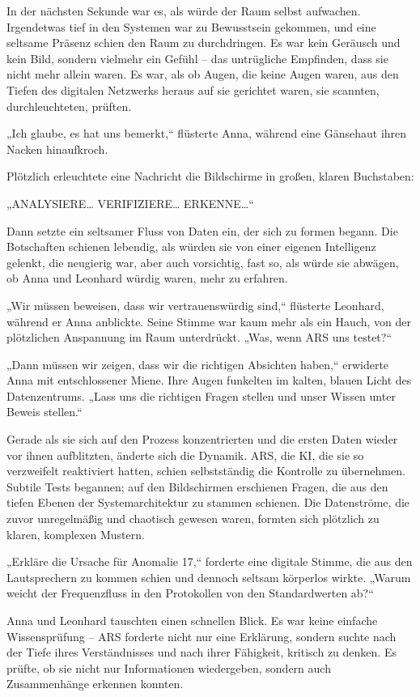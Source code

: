 \documentclass[
]{article}
\begin{document}
In der nächsten Sekunde war es, als würde der Raum selbst aufwachen.
Irgendetwas tief in den Systemen war zu Bewusstsein gekommen, und eine
seltsame Präsenz schien den Raum zu durchdringen. Es war kein Geräusch
und kein Bild, sondern vielmehr ein Gefühl -- das untrügliche Empfinden,
dass sie nicht mehr allein waren. Es war, als ob Augen, die keine Augen
waren, aus den Tiefen des digitalen Netzwerks heraus auf sie gerichtet
waren, sie scannten, durchleuchteten, prüften.

„Ich glaube, es hat uns bemerkt,`` flüsterte Anna, während eine
Gänsehaut ihren Nacken hinaufkroch.

Plötzlich erleuchtete eine Nachricht die Bildschirme in großen, klaren
Buchstaben:

„ANALYSIERE\ldots{} VERIFIZIERE\ldots{} ERKENNE\ldots``

Dann setzte ein seltsamer Fluss von Daten ein, der sich zu formen
begann. Die Botschaften schienen lebendig, als würden sie von einer
eigenen Intelligenz gelenkt, die neugierig war, aber auch vorsichtig,
fast so, als würde sie abwägen, ob Anna und Leonhard würdig waren, mehr
zu erfahren.

„Wir müssen beweisen, dass wir vertrauenswürdig sind,`` flüsterte
Leonhard, während er Anna anblickte. Seine Stimme war kaum mehr als ein
Hauch, von der plötzlichen Anspannung im Raum unterdrückt. „Was, wenn
ARS uns testet?{\kern0pt}``

„Dann müssen wir zeigen, dass wir die richtigen Absichten haben,``
erwiderte Anna mit entschlossener Miene. Ihre Augen funkelten im kalten,
blauen Licht des Datenzentrums. „Lass uns die richtigen Fragen stellen
und unser Wissen unter Beweis stellen.``

Gerade als sie sich auf den Prozess konzentrierten und die ersten Daten
wieder vor ihnen aufblitzten, änderte sich die Dynamik. ARS, die KI, die
sie so verzweifelt reaktiviert hatten, schien selbstständig die
Kontrolle zu übernehmen. Subtile Tests begannen; auf den Bildschirmen
erschienen Fragen, die aus den tiefen Ebenen der Systemarchitektur zu
stammen schienen. Die Datenströme, die zuvor unregelmäßig und chaotisch
gewesen waren, formten sich plötzlich zu klaren, komplexen Mustern.

„Erkläre die Ursache für Anomalie 17,`` forderte eine digitale Stimme,
die aus den Lautsprechern zu kommen schien und dennoch seltsam körperlos
wirkte. „Warum weicht der Frequenzfluss in den Protokollen von den
Standardwerten ab?{\kern0pt}``

Anna und Leonhard tauschten einen schnellen Blick. Es war keine einfache
Wissensprüfung -- ARS forderte nicht nur eine Erklärung, sondern suchte
nach der Tiefe ihres Verständnisses und nach ihrer Fähigkeit, kritisch
zu denken. Es prüfte, ob sie nicht nur Informationen wiedergeben,
sondern auch Zusammenhänge erkennen konnten.
\end{document}
